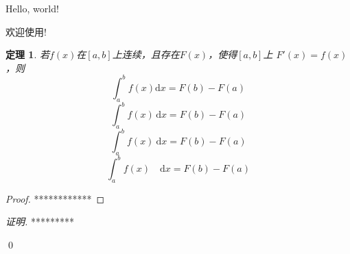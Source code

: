 \documentclass{ctexart}
\newtheorem{thm}{定理}
\begin{document}
	Hello, world!
	
	欢迎使用!
	
	
	
\begin{thm}
若$f(x)$在$[a,b]$上连续，且存在$F(x)$，使得$[a,b]$上
$F'(x)=f(x)$，则
\begin{equation}
    \int_{a}^{b}f(x)  \mathrm{d} x = F(b)-F(a)
\end{equation}
\begin{equation}
    \int_{a}^{b}f(x) \, \mathrm{d} x = F(b)-F(a)
\end{equation}
\begin{equation}
    \int_{a}^{b}f(x) \  \mathrm{d} x = F(b)-F(a)
\end{equation}\begin{equation}
    \int_{a}^{b}f(x) \quad \mathrm{d} x = F(b)-F(a)
\end{equation}
\end{thm}



\begin{proof}


************

\end{proof}


\noindent \emph{证明.}
*********

\qed
\end{document}
